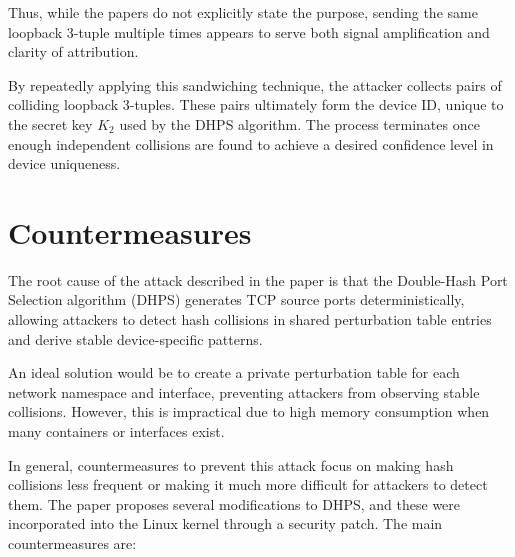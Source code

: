\documentclass{report}
\begin{document}
Thus, while the papers do not explicitly state the purpose, sending the same loopback 3-tuple multiple times appears to serve both signal amplification and clarity of attribution.

By repeatedly applying this sandwiching technique, the attacker collects pairs of colliding loopback 3-tuples. These pairs ultimately form the device ID, unique to the secret key $K_2$ used by the DHPS algorithm. The process terminates once enough independent collisions are found to achieve a desired confidence level in device uniqueness.

\begin{center}
	\begin{minipage}[t]{0.5\textwidth}
		\vspace{0cm}

		
	\end{minipage}
\end{center}

\vspace{0.5cm}
\chapter{Countermeasures}
\label{sec:countermeasures}

The \alert{root cause} of the attack described in the paper is that the Double-Hash Port Selection algorithm (DHPS) generates TCP source ports deterministically, allowing attackers to detect hash collisions in shared perturbation table entries and derive stable device-specific patterns.

An \alert{ideal solution} would be to create a private perturbation table for each network namespace and interface, preventing attackers from observing stable collisions. However, this is impractical due to high memory consumption when many containers or interfaces exist.

In \alert{general}, \alert{countermeasures} to prevent this attack focus on making hash collisions less frequent or making it much more difficult for attackers to detect them. The paper proposes several modifications to DHPS, and these were incorporated into the Linux kernel through a security patch. The main countermeasures are:
\end{document}
